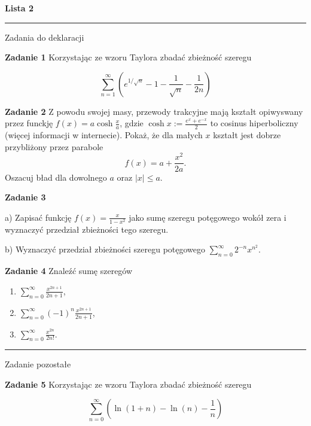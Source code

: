 \documentclass[a4paper,11pt]{article}
\begin{document}
\begin{center}
  {\large\textbf{Lista 2}}
\end{center}

\bigskip

\hrule

\begin{center}
    Zadania do deklaracji
\end{center}

\textbf{Zadanie 1} Korzystając ze wzoru Taylora zbadać zbieżność szeregu

\[
\sum_{n=1}^\infty \left(e^{1/\sqrt{n}} - 1 - \frac{1}{\sqrt{n}} 
- \frac{1}{2n}\right)
\]

\bigskip

\textbf{Zadanie 2} 
Z powodu swojej masy, przewody trakcyjne mają kształt opiwyswany przez funckję
${f(x) = a \cosh \frac{x}{a}}$, gdzie 
$\cosh x := \frac{e^x + e^{-x}}{2}$ 
to cosinus hiperboliczny (więcej informacji w internecie). Pokaż, że dla małych $x$ kształt jest dobrze przybliżony przez parabole
\[
f(x) = a + \frac{x^2}{2a}.
\]
Oszacuj bład dla dowolnego $a$ oraz $|x| \leq a$.

\bigskip

\textbf{Zadanie 3} 

a) Zapisać funkcję $f(x) = \frac{x}{1-x^2}$
jako sumę szeregu potęgowego wokół zera i wyznaczyć
przedział zbieżności tego szeregu.

b) Wyznaczyć przedział zbieżności szeregu potęgowego 
$\sum_{n=0}^\infty 2^{-n} x^{n^2}$.

\bigskip

\textbf{Zadanie 4} Znaleźć sumę szeregów
\begin{enumerate}[label=(\alph*)]
    \item $\displaystyle \sum \limits_{n=0}^\infty \frac{x^{2n+1}}{2n+1}$,
    \item $\displaystyle \sum \limits_{n=0}^\infty (-1)^{n} \frac{x^{2n+1}}{2n+1}$,
    \item $\displaystyle \sum \limits_{n=0}^\infty \frac{x^{2n}}{2n!}$.
\end{enumerate}

\hrule

\begin{center}
    Zadanie pozostałe
\end{center}

\textbf{Zadanie 5} Korzystając ze wzoru Taylora zbadać zbieżność szeregu

\[
\sum_{n=0}^\infty \left( \ln(1+n) - \ln(n) - \frac{1}{n}\right)
\]
\end{document}
